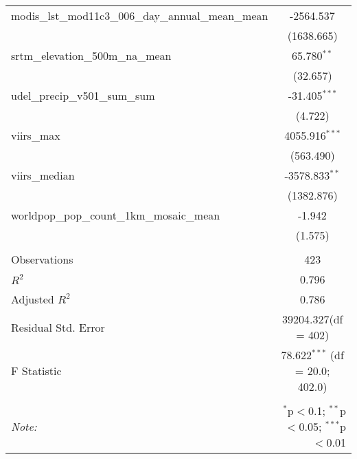 \begin{table}[!htbp]
\begin{tabular}{@{\extracolsep{5pt}}lc}
 modis_lst_mod11c3_006_day_annual_mean_mean & -2564.537$^{}$ \\
  & (1638.665) \\
 srtm_elevation_500m_na_mean & 65.780$^{**}$ \\
  & (32.657) \\
 udel_precip_v501_sum_sum & -31.405$^{***}$ \\
  & (4.722) \\
 viirs_max & 4055.916$^{***}$ \\
  & (563.490) \\
 viirs_median & -3578.833$^{**}$ \\
  & (1382.876) \\
 worldpop_pop_count_1km_mosaic_mean & -1.942$^{}$ \\
  & (1.575) \\
\hline \\[-1.8ex]
 Observations & 423 \\
 $R^2$ & 0.796 \\
 Adjusted $R^2$ & 0.786 \\
 Residual Std. Error & 39204.327(df = 402)  \\
 F Statistic & 78.622$^{***}$ (df = 20.0; 402.0) \\
\hline
\hline \\[-1.8ex]
\textit{Note:} & \multicolumn{1}{r}{$^{*}$p$<$0.1; $^{**}$p$<$0.05; $^{***}$p$<$0.01} \\
\end{tabular}
\end{table}